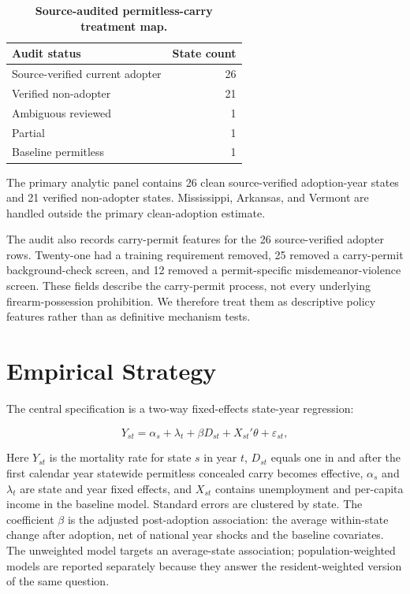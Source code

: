 \documentclass[11pt]{article}
\begin{document}
\begin{table}[H]
\centering
\caption{\textbf{Source-audited permitless-carry treatment map.}}
\label{tab:audit}
\begin{threeparttable}
\begin{tabular}{lr}
\toprule
Audit status & State count \\
\midrule
Source-verified current adopter & 26 \\
Verified non-adopter & 21 \\
Ambiguous reviewed & 1 \\
Partial & 1 \\
Baseline permitless & 1 \\
\bottomrule
\end{tabular}
\begin{tablenotes}
\small
\item The primary analytic panel contains 26 clean source-verified adoption-year states and 21 verified non-adopter states. Mississippi, Arkansas, and Vermont are handled outside the primary clean-adoption estimate.
\end{tablenotes}
\end{threeparttable}
\end{table}

The audit also records carry-permit features for the 26 source-verified adopter rows. Twenty-one had a training requirement removed, 25 removed a carry-permit background-check screen, and 12 removed a permit-specific misdemeanor-violence screen. These fields describe the carry-permit process, not every underlying firearm-possession prohibition. We therefore treat them as descriptive policy features rather than as definitive mechanism tests.

\section*{Empirical Strategy}

The central specification is a two-way fixed-effects state-year regression:

\[
Y_{st} = \alpha_s + \lambda_t + \beta D_{st} + X_{st}'\theta + \varepsilon_{st},
\]

Here $Y_{st}$ is the mortality rate for state $s$ in year $t$, $D_{st}$ equals one in and after the first calendar year statewide permitless concealed carry becomes effective, $\alpha_s$ and $\lambda_t$ are state and year fixed effects, and $X_{st}$ contains unemployment and per-capita income in the baseline model. Standard errors are clustered by state. The coefficient $\beta$ is the adjusted post-adoption association: the average within-state change after adoption, net of national year shocks and the baseline covariates. The unweighted model targets an average-state association; population-weighted models are reported separately because they answer the resident-weighted version of the same question.
\end{document}
